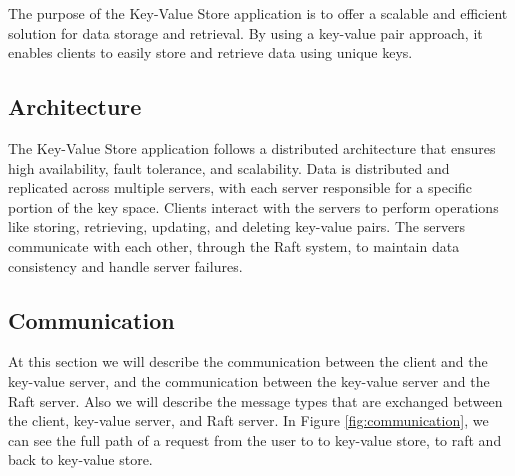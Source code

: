 \documentclass{article}
\begin{document}
The purpose of the Key-Value Store application is to offer a scalable and efficient solution
for data storage and retrieval. By using a key-value pair approach, it enables clients to
easily store and retrieve data using unique keys.


\subsection{Architecture}
The Key-Value Store application follows a distributed architecture that ensures high availability,
fault tolerance, and scalability. Data is distributed and replicated across multiple servers,
with each server responsible for a specific portion of the key space. Clients interact with the
servers to perform operations like storing, retrieving, updating, and deleting key-value
pairs. The servers communicate with each other, through the Raft system, to maintain
data consistency and handle server failures.

\subsection{Communication}
At this section we will describe the communication between the client and the key-value server,
and the communication between the key-value server and the Raft server. Also we will describe
the message types that are exchanged between the client, key-value server, and Raft server.
In Figure \ref{fig:communication}, we can see the full path of a request from the user to
to key-value store, to raft and back to key-value store.
\end{document}
